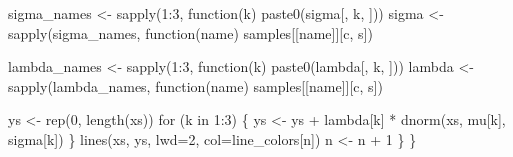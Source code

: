 \documentclass[
  letterpaper,
  DIV=11,
  numbers=noendperiod]{scrartcl}
\newenvironment{Shaded}{\begin{snugshade}}{\end{snugshade}}
\newcommand{\AttributeTok}[1]{\textcolor[rgb]{0.40,0.45,0.13}{#1}}
\newcommand{\ControlFlowTok}[1]{\textcolor[rgb]{0.00,0.23,0.31}{#1}}
\newcommand{\DecValTok}[1]{\textcolor[rgb]{0.68,0.00,0.00}{#1}}
\newcommand{\FunctionTok}[1]{\textcolor[rgb]{0.28,0.35,0.67}{#1}}
\newcommand{\NormalTok}[1]{\textcolor[rgb]{0.00,0.23,0.31}{#1}}
\newcommand{\OtherTok}[1]{\textcolor[rgb]{0.00,0.23,0.31}{#1}}
\newcommand{\SpecialCharTok}[1]{\textcolor[rgb]{0.37,0.37,0.37}{#1}}
\newcommand{\StringTok}[1]{\textcolor[rgb]{0.13,0.47,0.30}{#1}}
\begin{document}
\begin{Shaded}
\begin{Highlighting}[]
\NormalTok{    sigma\_names }\OtherTok{\textless{}{-}} \FunctionTok{sapply}\NormalTok{(}\DecValTok{1}\SpecialCharTok{:}\DecValTok{3}\NormalTok{, }\ControlFlowTok{function}\NormalTok{(k) }\FunctionTok{paste0}\NormalTok{(}\StringTok{\textquotesingle{}sigma[\textquotesingle{}}\NormalTok{, k, }\StringTok{\textquotesingle{}]\textquotesingle{}}\NormalTok{))}
\NormalTok{    sigma }\OtherTok{\textless{}{-}} \FunctionTok{sapply}\NormalTok{(sigma\_names, }\ControlFlowTok{function}\NormalTok{(name) samples[[name]][c, s])}

\NormalTok{    lambda\_names }\OtherTok{\textless{}{-}} \FunctionTok{sapply}\NormalTok{(}\DecValTok{1}\SpecialCharTok{:}\DecValTok{3}\NormalTok{, }\ControlFlowTok{function}\NormalTok{(k) }\FunctionTok{paste0}\NormalTok{(}\StringTok{\textquotesingle{}lambda[\textquotesingle{}}\NormalTok{, k, }\StringTok{\textquotesingle{}]\textquotesingle{}}\NormalTok{))}
\NormalTok{    lambda }\OtherTok{\textless{}{-}} \FunctionTok{sapply}\NormalTok{(lambda\_names, }\ControlFlowTok{function}\NormalTok{(name) samples[[name]][c, s])}

\NormalTok{    ys }\OtherTok{\textless{}{-}} \FunctionTok{rep}\NormalTok{(}\DecValTok{0}\NormalTok{, }\FunctionTok{length}\NormalTok{(xs))}
    \ControlFlowTok{for}\NormalTok{ (k }\ControlFlowTok{in} \DecValTok{1}\SpecialCharTok{:}\DecValTok{3}\NormalTok{) \{}
\NormalTok{      ys }\OtherTok{\textless{}{-}}\NormalTok{ ys }\SpecialCharTok{+}\NormalTok{ lambda[k] }\SpecialCharTok{*} \FunctionTok{dnorm}\NormalTok{(xs, mu[k], sigma[k])}
\NormalTok{    \}}
    \FunctionTok{lines}\NormalTok{(xs, ys, }\AttributeTok{lwd=}\DecValTok{2}\NormalTok{, }\AttributeTok{col=}\NormalTok{line\_colors[n])}
\NormalTok{    n }\OtherTok{\textless{}{-}}\NormalTok{ n }\SpecialCharTok{+} \DecValTok{1}
\NormalTok{  \}}
\NormalTok{\}}
\end{Highlighting}
\end{Shaded}
\end{document}

